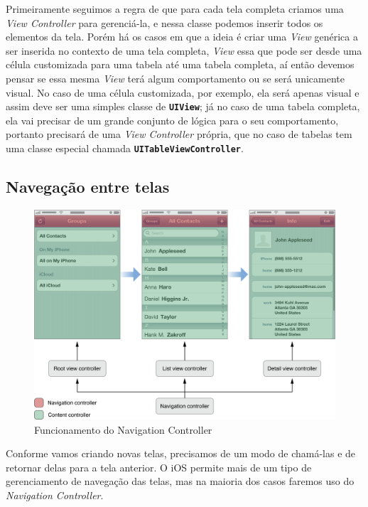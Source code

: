 \documentclass[a4paper,12pt,brazil,doubleside]{book}
\begin{document}
\begin{singlespace}
Primeiramente seguimos a regra de que para cada tela completa criamos uma \emph{View Controller} para gerenciá-la, e nessa classe podemos inserir todos os elementos da tela. Porém há os casos em que a ideia é criar uma \emph{View} genérica a ser inserida no contexto de uma tela completa, \emph{View} essa que pode ser desde uma célula customizada para uma tabela até uma tabela completa, aí então devemos pensar se essa mesma \emph{View} terá algum comportamento ou se será unicamente visual. No caso de uma célula customizada, por exemplo, ela será apenas visual e assim deve ser uma simples classe de \texttt{\textbf{UIView}}; já no caso de uma tabela completa, ela vai precisar de um grande conjunto de lógica para o seu comportamento, portanto precisará de uma \emph{View Controller} própria, que no caso de tabelas tem uma classe especial chamada \texttt{\textbf{UITableViewController}}.

\bigskip

\subsection{Navegação entre telas}

\begin{figure}[h]
  \centering
  \includegraphics[width=\textwidth]{figuras/apple_navigation_interface.png}
  \caption{Funcionamento do Navigation Controller}
  \label{fig:a}
\end{figure}


Conforme vamos criando novas telas, precisamos de um modo de chamá-las e de retornar delas para a tela anterior. O iOS permite mais de um tipo de gerenciamento de navegação das telas, mas na maioria dos casos faremos uso do \emph{Navigation Controller}.


\end{singlespace}
\end{document}
